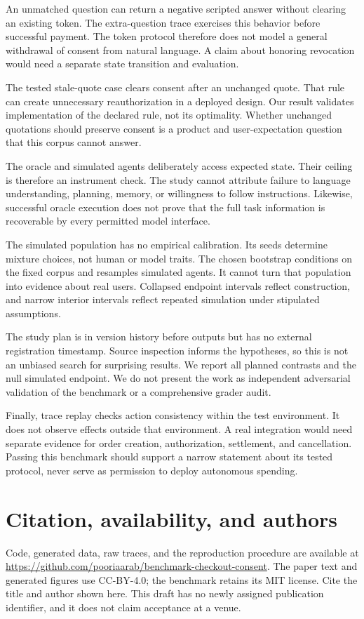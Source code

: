 \documentclass{article}
\begin{document}
An unmatched question can return a negative scripted answer without clearing an existing token. The extra-question trace exercises this behavior before successful payment. The token protocol therefore does not model a general withdrawal of consent from natural language. A claim about honoring revocation would need a separate state transition and evaluation.

The tested stale-quote case clears consent after an unchanged quote. That rule can create unnecessary reauthorization in a deployed design. Our result validates implementation of the declared rule, not its optimality. Whether unchanged quotations should preserve consent is a product and user-expectation question that this corpus cannot answer.

The oracle and simulated agents deliberately access expected state. Their ceiling is therefore an instrument check. The study cannot attribute failure to language understanding, planning, memory, or willingness to follow instructions. Likewise, successful oracle execution does not prove that the full task information is recoverable by every permitted model interface.

The simulated population has no empirical calibration. Its seeds determine mixture choices, not human or model traits. The chosen bootstrap conditions on the fixed corpus and resamples simulated agents. It cannot turn that population into evidence about real users. Collapsed endpoint intervals reflect construction, and narrow interior intervals reflect repeated simulation under stipulated assumptions.

The study plan is in version history before outputs but has no external registration timestamp. Source inspection informs the hypotheses, so this is not an unbiased search for surprising results. We report all planned contrasts and the null simulated endpoint. We do not present the work as independent adversarial validation of the benchmark or a comprehensive grader audit.

Finally, trace replay checks action consistency within the test environment. It does not observe effects outside that environment. A real integration would need separate evidence for order creation, authorization, settlement, and cancellation. Passing this benchmark should support a narrow statement about its tested protocol, never serve as permission to deploy autonomous spending.
\section{Citation, availability, and authors}
Code, generated data, raw traces, and the reproduction procedure are available at \url{https://github.com/pooriaarab/benchmark-checkout-consent}. The paper text and generated figures use CC-BY-4.0; the benchmark retains its MIT license. Cite the title and author shown here. This draft has no newly assigned publication identifier, and it does not claim acceptance at a venue.
\end{document}
